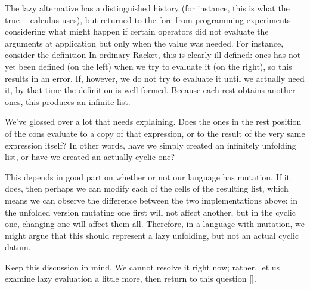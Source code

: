 
The lazy alternative has a distinguished history (for instance, this is what the
true - calculus uses), but returned to the fore from programming experiments
considering what might happen if certain operators did not evaluate the
arguments at application but only when the value was needed. For instance,
consider the definition
In ordinary Racket, this is clearly ill-defined: ones has not yet been defined
(on the left) when we try to evaluate it (on the right), so this results in an
error. If, however, we do not try to evaluate it until we actually need it, by
that time the definition is well-formed. Because each rest obtains another ones,
this produces an infinite list.

We’ve glossed over a lot that needs explaining. Does the ones in the rest
position of the cons evaluate to a copy of that expression, or to the result of
the very same expression itself? In other words, have we simply created an
infinitely unfolding list, or have we created an actually cyclic one?

This depends in good part on whether or not our language has mutation. If it
does, then perhaps we can modify each of the cells of the resulting list, which
means we can observe the difference between the two implementations above: in
the unfolded version mutating one first will not affect another, but in the
cyclic one, changing one will affect them all. Therefore, in a language with
mutation, we might argue that this should represent a lazy unfolding, but not an
actual cyclic datum.

Keep this discussion in mind. We cannot resolve it right now; rather, let us
examine lazy evaluation a little more, then return to this question \ref{}.
